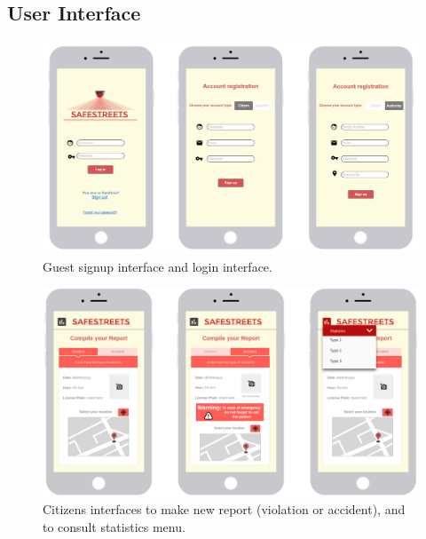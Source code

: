 \documentclass{report}
\begin{document}
\subsection{User Interface}
\begin{figure}[!ht]
	\begin{center}
	\includegraphics[width=\textwidth]{img/Mockup_logging.jpg}
	\end{center}
	\caption{Guest signup interface and login interface.}
\end{figure}
\begin{figure}[!htp]
	\begin{center}
	\includegraphics[width=\textwidth]{img/CitizensInterface.png}
	\end{center}
	\caption{Citizens interfaces to make new report (violation or accident), and to consult statistics menu.}
\end{figure}
\end{document}
